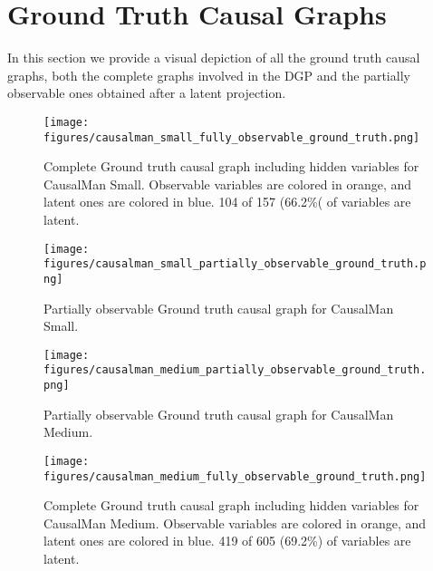 \section{Ground Truth Causal Graphs}

In this section we provide a visual depiction of all the ground truth causal graphs, both the complete graphs involved in the DGP and the partially observable ones obtained after a latent projection.

\begin{figure}[h]
\centering
\texttt{[image: figures/causalman\_small\_fully\_observable\_ground\_truth.png]}\label{fig:ground_truth_dataset0_annex}
\caption{Complete Ground truth causal graph including hidden variables for CausalMan Small. Observable variables are colored in orange, and latent ones are colored in blue. 104 of 157 (66.2\%( of variables are latent.}
\end{figure}

\begin{figure}[ht]
\centering
\texttt{[image: figures/causalman\_small\_partially\_observable\_ground\_truth.png]}\label{fig:ground_truth_partially_observable_dataset0_annex}
\caption{Partially observable Ground truth causal graph for CausalMan Small.}
\end{figure}

\newpage
\begin{figure}[ht]
\centering
\texttt{[image: figures/causalman\_medium\_partially\_observable\_ground\_truth.png]}\label{fig:ground_truth_partially_observable_dataset1_annex}
\caption{Partially observable Ground truth causal graph for CausalMan Medium.}
\end{figure}

\newpage
\begin{figure}[ht]
\centering
\texttt{[image: figures/causalman\_medium\_fully\_observable\_ground\_truth.png]}\label{fig:ground_truth_dataset1_annex}
\caption{Complete Ground truth causal graph including hidden variables for CausalMan Medium. Observable variables are colored in orange, and latent ones are colored in blue. 419 of 605 (69.2\%) of variables are latent.}
\end{figure}